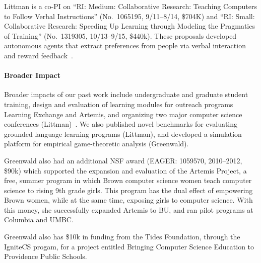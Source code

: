 Littman is a co-PI on ``RI: Medium: Collaborative Research: Teaching
Computers to Follow Verbal Instructions'' (No.\ 1065195, 9/11--8/14,
\$704K) and ``RI: Small: Collaborative Research: Speeding Up Learning
through Modeling the Pragmatics of Training'' (No.\ 1319305,
10/13--9/15, \$440k). These proposals developed autonomous agents that
extract preferences from people via verbal interaction and reward
feedback~\cite{loftin14b,macglashan15,macglashan15b}.

\paragraph{Broader Impact}

Broader impacts of our past work include undergraduate and graduate
student training, design and evaluation of learning modules for
outreach programs Learning Exchange and Artemis, and organizing two
major computer science conferences (Littman)~\cite{desjardins13}.
We also published novel benchmarks for evaluating grounded language
learning programs (Littman), and developed a simulation platform for
empirical game-theoretic analysis (Greenwald).

Greenwald also had an additional NSF award (EAGER: 1059570,
2010--2012, \$90k) which supported the expansion and evaluation of the
Artemis Project, a free, summer program in which Brown computer
science women teach computer science to rising 9th grade girls.  This
program has the dual effect of empowering Brown women, while at the
same time, exposing girls to computer science.  With this money, she
successfully expanded Artemis to BU, and ran pilot programs at
Columbia and UMBC.

Greenwald also has \$10k in funding from the Tides Foundation, through
the IgniteCS progam, for a project entitled Bringing Computer Science
Education to Providence Public Schools.

